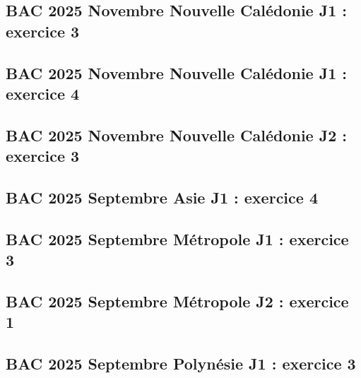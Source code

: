 \documentclass[lang=fr,edition=teacher,layout=sheet]{mxbook}
\begin{document}
\subsection*{BAC 2025 Novembre Nouvelle Calédonie J1 : exercice 3}
\begingroup\endgroup
\par\bigskip
{}\subsection*{BAC 2025 Novembre Nouvelle Calédonie J1 : exercice 4}
\begingroup\endgroup
\par\bigskip
{}\subsection*{BAC 2025 Novembre Nouvelle Calédonie J2 : exercice 3}
\begingroup\endgroup
\par\bigskip
{}\subsection*{BAC 2025 Septembre Asie J1 : exercice 4}
\begingroup\endgroup
\par\bigskip
{}\subsection*{BAC 2025 Septembre Métropole J1 : exercice 3}
\begingroup\endgroup
\par\bigskip
{}\subsection*{BAC 2025 Septembre Métropole J2 : exercice 1}
\begingroup\endgroup
\par\bigskip
{}\subsection*{BAC 2025 Septembre Polynésie J1 : exercice 3}
\end{document}
